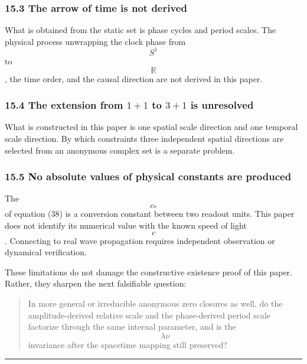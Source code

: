 \documentclass[
  a4paper,
]{article}
\begin{document}
\subsubsection{15.3 The arrow of time is not
derived}\label{the-arrow-of-time-is-not-derived}

What is obtained from the static set is phase cycles and period scales.
The physical process unwrapping the clock phase from \[S^1\] to
\[\mathbb R\], the time order, and the causal direction are not derived
in this paper.

\subsubsection{\texorpdfstring{15.4 The extension from \(1+1\) to
\(3+1\) is
unresolved}{15.4 The extension from 1+1 to 3+1 is unresolved}}\label{the-extension-from-11-to-31-is-unresolved}

What is constructed in this paper is one spatial scale direction and one
temporal scale direction. By which constraints three independent spatial
directions are selected from an anonymous complex set is a separate
problem.

\subsubsection{15.5 No absolute values of physical constants are
produced}\label{no-absolute-values-of-physical-constants-are-produced}

The \[c_*\] of equation (38) is a conversion constant between two
readout units. This paper does not identify its numerical value with the
known speed of light \[c\]. Connecting to real wave propagation requires
independent observation or dynamical verification.

These limitations do not damage the constructive existence proof of this
paper. Rather, they sharpen the next falsifiable question:

\begin{quote}
In more general or irreducible anonymous zero closures as well, do the
amplitude-derived relative scale and the phase-derived period scale
factorize through the same internal parameter, and is the \[\lambda\nu\]
invariance after the spacetime mapping still preserved?
\end{quote}

\begin{center}\rule{0.5\linewidth}{0.5pt}\end{center}
\end{document}

